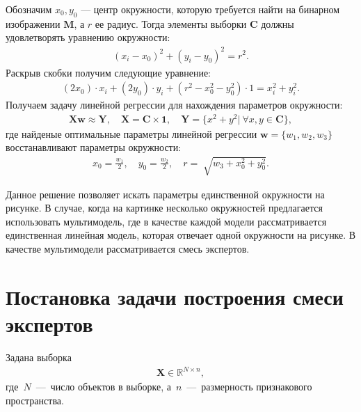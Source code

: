 \documentclass[12pt, twoside]{article}
\numberwithin{equation}{section}
\begin{document}
Обозначим $x_0, y_0$ --- центр окружности, которую требуется найти на бинарном изображении $\textbf{M}$, а $r$ ее радиус. Тогда элементы выборки $\textbf{C}$ должны удовлетворять уравнению окружности:
\begin{equation}
\label{eq:st:cr:3}
\begin{aligned}
\left(x_i - x_0\right)^{2}+\left(y_i-y_0\right)^2 = r^2.
\end{aligned}
\end{equation}
Раскрыв скобки получим следующие уравнение:
\begin{equation}
\label{eq:st:cr:4}
\begin{aligned}
(2x_0)\cdot x_i + (2y_0)\cdot y_i+(r^2-x_0^2-y_0^2)\cdot1 = x_{i}^2 + y_{i}^2.
\end{aligned}
\end{equation}
Получаем задачу линейной регрессии для нахождения параметров окружности:
\begin{equation}
\label{eq:st:cr:5}
\begin{aligned}
\textbf{X}\textbf{w} \approx \textbf{Y},  \quad \textbf{X} = \textbf{C}\times \textbf{1}, \quad \textbf{Y} = \{x^2+y^2|~\forall x,y \in \textbf{C}\},
\end{aligned}
\end{equation}
где найденые оптимальные параметры линейной регрессии $\textbf{w} = \{w_1, w_2, w_3\}$ восстанавливают параметры окружности:
\begin{equation}
\label{eq:st:cr:6}
\begin{aligned}
x_0 = \frac{w_1}{2}, \quad y_0 = \frac{w_2}{2}, \quad r = \sqrt[]{w_3+x_{0}^{2}+y_{0}^{2}}.
\end{aligned}
\end{equation}

Данное решение позволяет искать параметры единственной окружности на рисунке. В случае, когда на картинке несколько окружностей предлагается использовать мультимодель, где в качестве каждой модели рассматривается единственная линейная модель, которая отвечает одной окружности на рисунке. В качестве мультимодели рассматривается смесь экспертов.

\section{Постановка задачи построения смеси экспертов}

Задана выборка
\begin{equation}
\label{eq:st:1}
\begin{aligned}
\textbf{X} \in \mathbb{R}^{N \times n},
\end{aligned}
\end{equation}
где~$N$~---~число объектов в выборке, а~$n$~---~размерность признакового пространства.
\end{document}

